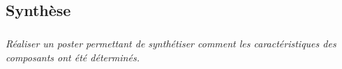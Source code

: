 \documentclass[10pt,fleqn]{article} %
\begin{document}
\begin{multicols}{2}
\begin{multicols}{2}
\subsection*{Synthèse}
\subparagraph{}
\textit{Réaliser un poster permettant de synthétiser comment les caractéristiques des composants ont été déterminés.}
%
\ifprof
\else
\footnotesize

\fi

\normalsize


\ifprof
\end{multicols}
\else
\end{multicols}
\fi
\end{document}
